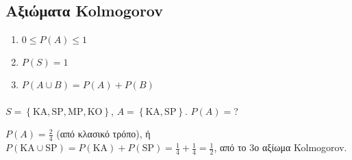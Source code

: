 \documentclass[11pt,a4paper,titlepage,draft]{article}
\newcommand{\textlatin}[1]{#1}
\begin{document}
\subsection{Αξιώματα \textlatin{Kolmogorov}}
\begin{enumerate}
\item \(0 \leq P(A) \leq 1\)
\item \( P(S) = 1\)
\item \( P(A \cup B) = P(A) + P(B) \)
\end{enumerate}

\paragraph{}
\(S= \left\lbrace \text{ΚΑ}, \text{SP},\text{MP},\text{KO} \right\rbrace\),
\(A=  \left\lbrace \text{KA}, \text{SP} \right\rbrace\). \(P(A) = \)?

\(P(A) = \frac{2}{4}\) (από κλασικό τρόπο), ή
\(P(\text{KA} \cup \text{SP}) = P(\text{KA})+P(\text{SP}) = \frac{1}{4} + \frac{1}{4}= \frac{1}{2}\), από το 3ο αξίωμα \textlatin{Kolmogorov}.
\end{document}
